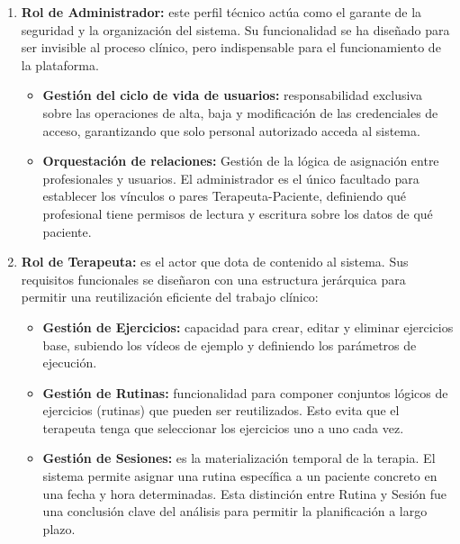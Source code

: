 \begin{enumerate}
    \item \textbf{Rol de Administrador:} este perfil técnico actúa como el garante de la seguridad y la organización del sistema. Su funcionalidad se ha diseñado para ser invisible al proceso clínico, pero indispensable para el funcionamiento de la plataforma.
    \begin{itemize}
        \item \textbf{Gestión del ciclo de vida de usuarios:} responsabilidad exclusiva sobre las operaciones de alta, baja y modificación de las credenciales de acceso, garantizando que solo personal autorizado acceda al sistema.
        \item \textbf{Orquestación de relaciones:} Gestión de la lógica de asignación entre profesionales y usuarios. El administrador es el único facultado para establecer los vínculos o pares Terapeuta-Paciente, definiendo qué profesional tiene permisos de lectura y escritura sobre los datos de qué paciente.
    \end{itemize}

    \item \textbf{Rol de Terapeuta:} es el actor que dota de contenido al sistema. Sus requisitos funcionales se diseñaron con una estructura jerárquica para permitir una reutilización eficiente del trabajo clínico:
    \begin{itemize}
        \item \textbf{Gestión de Ejercicios:} capacidad para crear, editar y eliminar ejercicios base, subiendo los vídeos de ejemplo y definiendo los parámetros de ejecución.
        \item \textbf{Gestión de Rutinas:} funcionalidad para componer conjuntos lógicos de ejercicios (rutinas) que pueden ser reutilizados. Esto evita que el terapeuta tenga que seleccionar los ejercicios uno a uno cada vez.
        \item \textbf{Gestión de Sesiones:} es la materialización temporal de la terapia. El sistema permite asignar una rutina específica a un paciente concreto en una fecha y hora determinadas. Esta distinción entre Rutina y Sesión fue una conclusión clave del análisis para permitir la planificación a largo plazo.
    \end{itemize}


\end{enumerate}
